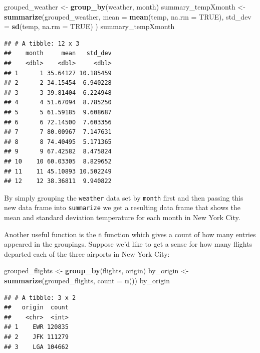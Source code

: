 \documentclass[]{tufte-book}
\newenvironment{Shaded}{\begin{snugshade}}{\end{snugshade}}
\newcommand{\KeywordTok}[1]{\textcolor[rgb]{0.13,0.29,0.53}{\textbf{{#1}}}}
\newcommand{\DataTypeTok}[1]{\textcolor[rgb]{0.13,0.29,0.53}{{#1}}}
\newcommand{\StringTok}[1]{\textcolor[rgb]{0.31,0.60,0.02}{{#1}}}
\newcommand{\OtherTok}[1]{\textcolor[rgb]{0.56,0.35,0.01}{{#1}}}
\newcommand{\NormalTok}[1]{{#1}}
\begin{document}
\begin{Shaded}
\begin{Highlighting}[]
\NormalTok{grouped_weather <-}\StringTok{ }\KeywordTok{group_by}\NormalTok{(weather, month)}
\NormalTok{summary_tempXmonth <-}\StringTok{ }\KeywordTok{summarize}\NormalTok{(grouped_weather,}
          \DataTypeTok{mean =} \KeywordTok{mean}\NormalTok{(temp, }\DataTypeTok{na.rm =} \OtherTok{TRUE}\NormalTok{),}
          \DataTypeTok{std_dev =} \KeywordTok{sd}\NormalTok{(temp, }\DataTypeTok{na.rm =} \OtherTok{TRUE}\NormalTok{)}
          \NormalTok{)}
\NormalTok{summary_tempXmonth}
\end{Highlighting}
\end{Shaded}

\begin{verbatim}
## # A tibble: 12 x 3
##    month     mean   std_dev
##    <dbl>    <dbl>     <dbl>
## 1      1 35.64127 10.185459
## 2      2 34.15454  6.940228
## 3      3 39.81404  6.224948
## 4      4 51.67094  8.785250
## 5      5 61.59185  9.608687
## 6      6 72.14500  7.603356
## 7      7 80.00967  7.147631
## 8      8 74.40495  5.171365
## 9      9 67.42582  8.475824
## 10    10 60.03305  8.829652
## 11    11 45.10893 10.502249
## 12    12 38.36811  9.940822
\end{verbatim}

By simply grouping the \texttt{weather} data set by \texttt{month} first
and then passing this new data frame into \texttt{summarize} we get a
resulting data frame that shows the mean and standard deviation
temperature for each month in New York City.

Another useful function is the \texttt{n} function which gives a count
of how many entries appeared in the groupings. Suppose we'd like to get
a sense for how many flights departed each of the three airports in New
York City:

\begin{Shaded}
\begin{Highlighting}[]
\NormalTok{grouped_flights <-}\StringTok{ }\KeywordTok{group_by}\NormalTok{(flights, origin)}
\NormalTok{by_origin <-}\StringTok{ }\KeywordTok{summarize}\NormalTok{(grouped_flights,}
                       \DataTypeTok{count =} \KeywordTok{n}\NormalTok{())}
\NormalTok{by_origin}
\end{Highlighting}
\end{Shaded}

\begin{verbatim}
## # A tibble: 3 x 2
##   origin  count
##    <chr>  <int>
## 1    EWR 120835
## 2    JFK 111279
## 3    LGA 104662
\end{verbatim}
\end{document}
